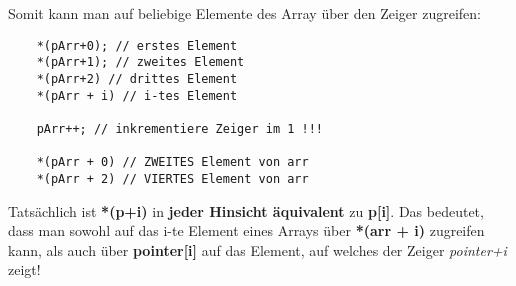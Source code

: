 \documentclass[
  accentcolor=tud1c,	%
  colorbacktitle,		%
  inverttitle,			%
  german,				%
  twoside
]{tudexercise}
\begin{document}
Somit kann man auf beliebige Elemente des Array über den Zeiger zugreifen:
\begin{lstlisting}
	*(pArr+0); // erstes Element
	*(pArr+1); // zweites Element
	*(pArr+2) // drittes Element
	*(pArr + i) // i-tes Element
	
	pArr++; // inkrementiere Zeiger im 1 !!!
	
	*(pArr + 0) // ZWEITES Element von arr
	*(pArr + 2) // VIERTES Element von arr
\end{lstlisting}

Tatsächlich ist \textbf{*(p+i)} in \textbf{jeder Hinsicht äquivalent} zu \textbf{p[i]}. Das bedeutet, dass man sowohl auf das i-te Element eines Arrays über \textbf{*(arr + i)} zugreifen kann, als auch über \textbf{pointer[i]} auf das Element, auf welches der Zeiger \emph{pointer+i} zeigt!
\end{document}
